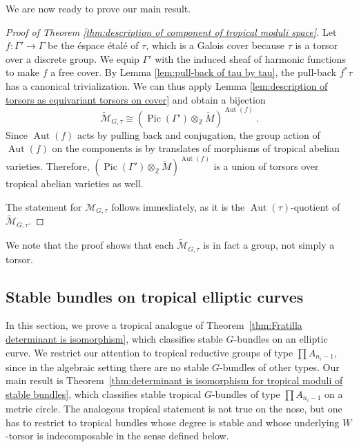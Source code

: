 \documentclass[10pt, a4paper]{amsart}
\theoremstyle{definition}
\theoremstyle{myitemstyle}
\newcommand{\Z}{\mathbb{Z}}
\newcommand{\Mcheck}{{\check{M}}}
\newcommand{\mc}[1]{{\mathcal{#1}}}
\newcommand{\wmc}[1]{{\widetilde{\mathcal{#1}}}}
\DeclareMathOperator{\Pic}{Pic}
\DeclareMathOperator{\Aut}{Aut}
\newcommand{\Ga}{\Gamma}
\begin{document}
We are now ready to prove our main result.




\begin{proof}[Proof of Theorem \ref{thm:description of component of tropical moduli space}]
\label{proof of thm about components}
Let $f\colon\Gamma'\to \Gamma$ be the éspace étalé of $\tau$, which is a Galois cover because $\tau$ is a torsor over a discrete group. We equip $\Gamma'$ with the induced sheaf of harmonic functions to make $f$ a free cover. By Lemma \ref{lem:pull-back of tau by tau},  the pull-back $f^{*}\tau$ has a canonical trivialization. We can thus apply Lemma \ref{lem:description of torsors as equivariant torsors on cover} and obtain a bijection
\[
    \wmc M_{G,\tau}\cong (\Pic(\Gamma')\otimes_\Z \Mcheck)^{\Aut(f)} \ .
\]
Since $\Aut(f)$ acts by pulling back and conjugation, the group action of $\Aut(f)$ on the components is by translates of morphisms of tropical abelian varieties. Therefore, $(\Pic(\Ga')\otimes_\Z \Mcheck)^{\Aut(f)}$ is a union of torsors over tropical abelian varieties as well.

The statement for $\mc M_{G,\tau}$ follows immediately, as it is the $\Aut(\tau)$-quotient of $\wmc M_{G,\tau}$.
\end{proof}

 We note that the proof shows that each $\wmc M_{G,\tau}$ is in fact a group, not simply a torsor. 
















\subsection{Stable bundles on tropical elliptic curves}
\label{subsec:stable bundles on tropical elliptic curves}

In this section, we prove a tropical analogue of Theorem~\ref{thm:Fratilla determinant is isomorphism}, which classifies stable $G$-bundles on an elliptic curve. We restrict our attention to tropical reductive groups of type $\prod A_{n_i-1}$, since in the algebraic setting there are no stable $G$-bundles of other types. Our main result is Theorem~\ref{thm:determinant is isomorphism for tropical moduli of stable bundles}, which classifies stable tropical $G$-bundles of type $\prod A_{n_i-1}$ on a metric circle. The analogous tropical statement is not true on the nose, but one has to restrict to tropical bundles whose degree is stable and whose underlying $W$-torsor is indecomposable in the sense defined below.
\end{document}
